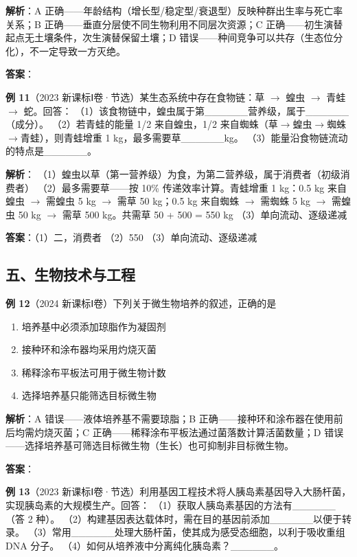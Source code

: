 \textbf{解析}：A 正确——年龄结构（增长型/稳定型/衰退型）反映种群出生率与死亡率关系；B 正确——垂直分层使不同生物利用不同层次资源；C 正确——初生演替起点无土壤条件，次生演替保留土壤；D 错误——种间竞争可以共存（生态位分化），不一定导致一方灭绝。

\textbf{答案}：

\textbf{例 11}（2023 新课标Ⅰ卷·节选）某生态系统中存在食物链：草 $\to$ 蝗虫 $\to$ 青蛙 $\to$ 蛇。回答：
（1）该食物链中，蝗虫属于第\_\_\_\_\_\_营养级，属于\_\_\_\_\_\_（成分）。
（2）若青蛙的能量 1/2 来自蝗虫，1/2 来自蜘蛛（草$\to$蝗虫$\to$蜘蛛$\to$青蛙），则青蛙增重 1 kg，最多需要草\_\_\_\_\_\_kg。
（3）能量沿食物链流动的特点是\_\_\_\_\_\_。

\textbf{解析}：
（1）蝗虫以草（第一营养级）为食，为第二营养级，属于消费者（初级消费者）
（2）最多需要草——按 10\% 传递效率计算。青蛙增重 1 kg：0.5 kg 来自蝗虫 $\to$ 需蝗虫 5 kg $\to$ 需草 50 kg；0.5 kg 来自蜘蛛 $\to$ 需蜘蛛 5 kg $\to$ 需蝗虫 50 kg $\to$ 需草 500 kg。共需草 50 + 500 = 550 kg
（3）单向流动、逐级递减

\textbf{答案}：（1）二，消费者 （2）550 （3）单向流动、逐级递减

\subsection{五、生物技术与工程}

\textbf{例 12}（2024 新课标Ⅰ卷）下列关于微生物培养的叙述，正确的是
\begin{enumerate}
  \item[A.] 培养基中必须添加琼脂作为凝固剂
  \item[B.] 接种环和涂布器均采用灼烧灭菌
  \item[C.] 稀释涂布平板法可用于微生物计数
  \item[D.] 选择培养基只能筛选目标微生物
\end{enumerate}

\textbf{解析}：A 错误——液体培养基不需要琼脂；B 正确——接种环和涂布器在使用前后均需灼烧灭菌；C 正确——稀释涂布平板法通过菌落数计算活菌数量；D 错误——选择培养基可筛选目标微生物（生长）也可抑制非目标微生物。

\textbf{答案}：

\textbf{例 13}（2023 新课标Ⅰ卷·节选）利用基因工程技术将人胰岛素基因导入大肠杆菌，实现胰岛素的大规模生产。回答：
（1）获取人胰岛素基因的方法有\_\_\_\_\_\_（答 2 种）。
（2）构建基因表达载体时，需在目的基因前添加\_\_\_\_\_\_以便于转录。
（3）常用\_\_\_\_\_\_处理大肠杆菌，使其成为感受态细胞，以利于吸收重组 DNA 分子。
（4）如何从培养液中分离纯化胰岛素？\_\_\_\_\_\_。

